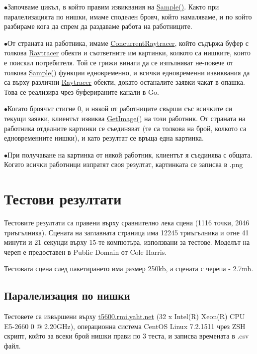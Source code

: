 \documentclass[12pt]{extarticle}
\newlength{\bulletwidth}\settowidth{\bulletwidth}{$\bullet$}
\newcommand{\mitem}{\vspace{5mm}\setlength{\leftskip}{\leftmargin}\hspace*{-\labelsep}\hspace*{-\bulletwidth}$\bullet$\hspace*{\labelsep}}
\newcommand{\mend}{\setlength{\leftskip}{0cm}\vspace{5mm}}
\begin{document}
	\mitem Започваме цикъл, в който правим извиквания на \href{https://godoc.org/github.com/DexterLB/traytor/rpc#RemoteRaytracer.Sample}{Sample()}.
	Както при паралелизацията по нишки, имаме споделен брояч, който
	намаляваме, и по който разбираме кога да спрем да раздаваме
	работа на работниците.
	
	\mitem От страната на работника, имаме \href{https://godoc.org/github.com/DexterLB/traytor/rpc#ConcurrentRaytracer}{ConcurrentRaytracer},
	който съдържа буфер с толкова \href{https://godoc.org/github.com/DexterLB/traytor/raytracer#Raytracer}{Raytracer} обекти и съответните
	им картинки, колкото са нишките, които е поискал потребителя. Той
	се грижи винаги да се изпълняват не-повече от толкова
	\href{https://godoc.org/github.com/DexterLB/traytor/raytracer#Raytracer.Sample}{Sample()}
	функции едновременно, и всички едновременни извиквания да са
	върху различни \href{https://godoc.org/github.com/DexterLB/traytor/raytracer#Raytracer}{Raytracer} обекти, докато останалите
	заявки чакат в опашка. Това се реализира
	чрез буферираните канали в Go.
	
	\mitem Когато броячът стигне 0, и някой от работниците свърши
	със всичките си текущи заявки, клиентът извиква
	\href{https://godoc.org/github.com/DexterLB/traytor/rpc#RemoteRaytracerCaller.GetImage}{GetImage()}
	на този работник. От страната на работника отделните картинки
	се съединяват (те са толкова на брой, колкото са едновременните
	нишки), и като резултат се връща една картинка.
	
	\mitem При получаване на картинка от някой работник, клиентът я
	съединява с общата. Когато всички работници изпратят своя
	резултат, картинката се записва в .png

	\mend

\section{Тестови резултати}
Тестовите резултати са правени върху сравнително лека сцена (1116
точки, 2046 триъгълника). Сцената на заглавната страница има 12245
триъгълника и отне
41 минути и 21 секунди върху 15-те компютъра, използвани за тестове.
Моделът на череп е предоставен в Public Domain от Cole Harris.

Тестовата сцена след пакетирането има размер 250kb, а сцената с
черепа - 2.7mb.

\subsection{Паралелизация по нишки}
Тестовете са извършени върху \url{t5600.rmi.yaht.net}
(32 x Intel(R) Xeon(R) CPU E5-2660 0 @ 2.20GHz),
операционна система CentOS Linux 7.2.1511 чрез ZSH скрипт,
който за всеки брой нишки прави по 3 теста, и записва времената
в .csv файл.
\end{document}
